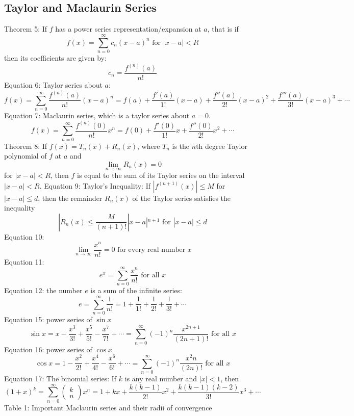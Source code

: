 \documentclass{article}
\begin{document}
    \subsection{Taylor and Maclaurin Series}
    \begin{outline}
        \1 Theorem 5: If $f$ has a power series representation/expansion at $a$, that is if \[f(x)=\sum^\infty_{n=0}c_n(x-a)^n \text{ for } |x-a|<R\] then its coefficients are given by: \[c_n=\dfrac{f^{(n)}(a)}{n!}\]
        \1 Equation 6: Taylor series about $a$: \[f(x)=\sum^\infty_{n=0}\dfrac{f^{(n)}(a)}{n!}(x-a)^n=f(a)+\dfrac{f'(a)}{1!}(x-a)+\dfrac{f''(a)}{2!}(x-a)^2+\dfrac{f'''(a)}{3!}(x-a)^3+\cdots\]
        \1 Equation 7: Maclaurin series, which is a taylor series about $a=0$. \[f(x)=\sum^\infty_{n=0}\dfrac{f^{(n)}(0)}{n!}x^n=f(0)+\dfrac{f'(0)}{1!}x+\dfrac{f''(0)}{2!}x^2+\cdots\]
        \1 Theorem 8: If \(f(x)=T_n(x)+R_n(x)\), where $T_n$ is the $n$th degree Taylor polynomial of $f$ at $a$ and \[\lim_{n\to\infty}R_n(x)=0\] for \(|x-a|<R\), then $f$ is equal to the sum of its Taylor series on the interval \(|x-a|<R\). 
        \1 Equation 9: Taylor's Inequality: If \(|f^{(n+1)}(x)|\leq M\) for \(|x-a|\leq d\), then the remainder \(R_n(x)\) of the Taylor series satisfies the inequality \[|R_n(x)\leq\dfrac{M}{(n+1)!}|x-a|^{n+1}\mbox{ for }|x-a|\leq d\]
        \1 Equation 10: \[\lim_{n\to\infty}\dfrac{x^n}{n!}=0\mbox{ for every real number }x\]
        \1 Equation 11: \[e^x=\sum^\infty_{n=0}\dfrac{x^n}{n!}\mbox{ for all }x\]
        \1 Equation 12: the number $e$ is a sum of the infinite series: \[e=\sum^\infty_{n=0}\dfrac{1}{n!}=1+\dfrac{1}{1!}+\dfrac{1}{2!}+\dfrac{1}{3!}+\cdots\]
        \1 Equation 15: power series of \(\sin x\)\[\sin x=x-\dfrac{x^3}{3!}+\dfrac{x^5}{5!}-\dfrac{x^7}{7!}+\cdots=\sum^\infty_{n=0}(-1)^n\dfrac{x^{2n+1}}{(2n+1)!}\mbox{ for all }x\]
        \1 Equation 16: power series of \(\cos x\)\[\cos x=1-\dfrac{x^2}{2!}+\dfrac{x^4}{4!}-\dfrac{x^6}{6!}+\cdots=\sum^\infty_{n=0}(-1)^n\dfrac{x^2n}{(2n)!}\text{ for all }x\]
        \1 Equation 17: The binomial series: If $k$ is any real number and \(|x|<1\), then \[(1+x)^k=\sum^\infty_{n=0}\begin{pmatrix}k\\n\end{pmatrix}x^n=1+kx+\dfrac{k(k-1)}{2!}x^2+\dfrac{k(k-1)(k-2)}{3!}x^3+\cdots\]
        \1 Table 1: Important Maclaurin series and their radii of convergence
    \end{outline}
\end{document}

